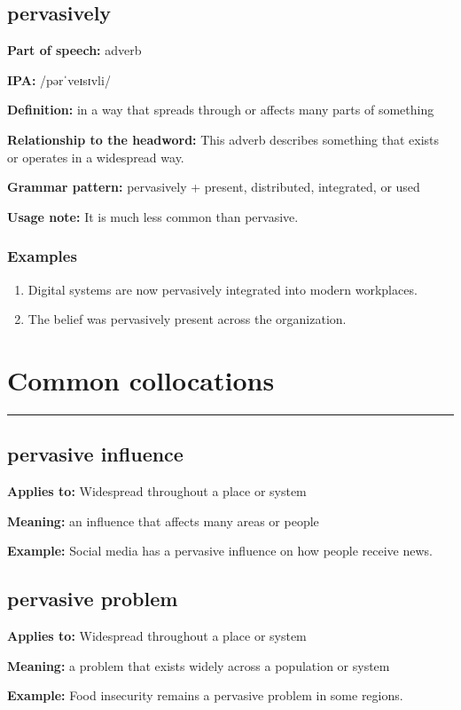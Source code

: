 \documentclass[11pt]{article}
\newcommand{\sectionrule}{\par\vspace{-0.5em}\noindent\textcolor{Accent}{\rule{\linewidth}{0.6pt}}\par}
\begin{document}
\subsection{pervasively}
\textbf{Part of speech:} adverb

\textbf{IPA:} /pərˈveɪsɪvli/

\textbf{Definition:} in a way that spreads through or affects many parts of something

\textbf{Relationship to the headword:} This adverb describes something that exists or operates in a widespread way.

\textbf{Grammar pattern:} pervasively + present, distributed, integrated, or used

\textbf{Usage note:} It is much less common than pervasive.

\subsubsection{Examples}
\begin{enumerate}
  \item Digital systems are now pervasively integrated into modern workplaces.
  \item The belief was pervasively present across the organization.
\end{enumerate}

\section{Common collocations}
\sectionrule
\subsection{pervasive influence}
\textbf{Applies to:} Widespread throughout a place or system

\textbf{Meaning:} an influence that affects many areas or people

\textbf{Example:} Social media has a pervasive influence on how people receive news.

\subsection{pervasive problem}
\textbf{Applies to:} Widespread throughout a place or system

\textbf{Meaning:} a problem that exists widely across a population or system

\textbf{Example:} Food insecurity remains a pervasive problem in some regions.
\end{document}
